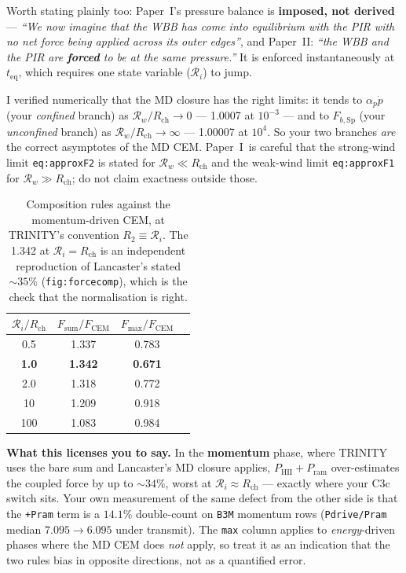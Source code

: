\documentclass[11pt,a4paper,oneside]{report}
\newcommand{\brkus}{\textunderscore\allowbreak}
\newcommand{\code}[1]{\texttt{\small\let\_\brkus #1}}
\newcommand{\lbl}[1]{\texttt{\footnotesize\let\_\brkus #1}}
\newcommand{\PI}{Paper~I}
\newcommand{\PII}{Paper~II}
\newcommand{\Rw}{\mathcal{R}_{w}}
\newcommand{\Ri}{\mathcal{R}_{i}}
\newcommand{\Rch}{R_{\mathrm{ch}}}
\newcommand{\pdotw}{\dot p}
\newcommand{\ap}{\alpha_p}
\newcommand{\Pram}{P_{\mathrm{ram}}}
\newcommand{\PHII}{P_{\mathrm{HII}}}
\newcommand{\Fsp}{F_{b,\mathrm{Sp}}}
\newcommand{\Fcem}{F_{\mathrm{CEM}}}
\newcommand{\up}[1]{\textcolor{tqaccent}{\textbf{#1}}}
\begin{document}
Worth stating plainly too: \PI's pressure balance is \up{imposed, not derived} ---
\emph{``We now imagine that the WBB has come into equilibrium with the PIR with no net force
being applied across its outer edges''}, and \PII: \emph{``the WBB and the PIR are
\textbf{forced} to be at the same pressure.''} It is enforced instantaneously at
$t_{\mathrm{eq}}$, which requires one state variable ($\Ri$) to jump.

I verified numerically that the MD closure has the right limits: it tends to $\ap\pdotw$
(your \emph{confined} branch) as $\Rw/\Rch\to0$ --- 1.0007 at $10^{-3}$ --- and to $\Fsp$
(your \emph{unconfined} branch) as $\Rw/\Rch\to\infty$ --- 1.00007 at $10^4$. So your two
branches \emph{are} the correct asymptotes of the MD CEM. \PI\ is careful that the
strong-wind limit \lbl{eq:approxF2} is stated for $\Rw\ll\Rch$ and the weak-wind limit
\lbl{eq:approxF1} for $\Rw\gg\Rch$; do not claim exactness outside those.

\begin{table}[htbp]\centering\small
\begin{tabular}{@{}cccc@{}}
\toprule
$\Ri/\Rch$ & $F_{\mathrm{sum}}/\Fcem$ & $F_{\max}/\Fcem$\\
\midrule
0.5   & 1.337 & 0.783\\
\up{1.0} & \up{1.342} & \up{0.671}\\
2.0   & 1.318 & 0.772\\
10    & 1.209 & 0.918\\
100   & 1.083 & 0.984\\
\bottomrule
\end{tabular}
\caption{Composition rules against the momentum-driven CEM, at TRINITY's convention
$R_2\equiv\Ri$. The 1.342 at $\Ri=\Rch$ is an independent reproduction of Lancaster's stated
${\sim}35\%$ (\lbl{fig:force\_comp}), which is the check that the normalisation is right.}
\end{table}

\begin{keybox}
\textbf{\sffamily What this licenses you to say.} In the \up{momentum} phase, where TRINITY
uses the bare sum and Lancaster's MD closure applies, $\PHII+\Pram$ over-estimates the
coupled force by up to ${\sim}34\%$, worst at $\Ri\approx\Rch$ --- exactly where your C3c
switch sits. Your own measurement of the same defect from the other side is that the
\code{+P\_ram} term is a $14.1\%$ double-count on \code{B3M} momentum rows
(\code{P\_drive/P\_ram} median $7.095 \to 6.095$ under transmit). The \code{max} column
applies to \emph{energy}-driven phases where the MD CEM does \emph{not} apply, so treat it
as an indication that the two rules bias in opposite directions, not as a quantified error.
\end{keybox}
\end{document}
